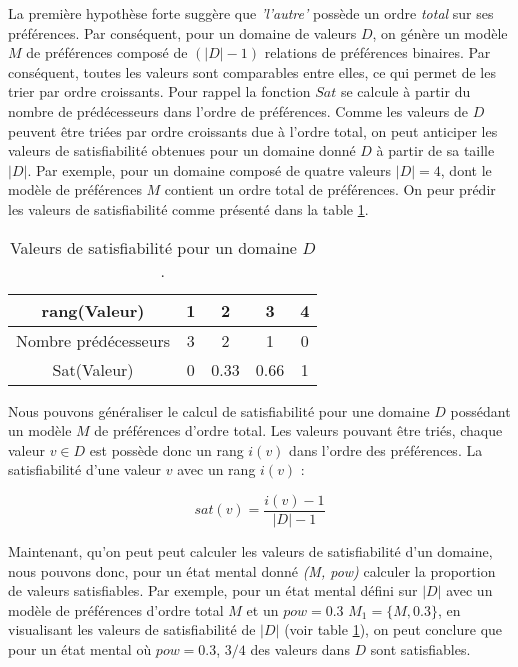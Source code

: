 \documentclass{llncs}
\begin{document}
	La première hypothèse forte suggère que \emph{'l'autre'} possède un ordre \emph{total} sur ses préférences. Par conséquent, pour un domaine de valeurs $D$, on génère un modèle $M$ de préférences composé de $(|D| -1)$ relations de préférences binaires. Par conséquent, toutes les valeurs sont comparables entre elles, ce qui permet de les trier par ordre croissants.
	 Pour rappel la fonction $Sat$ se calcule à partir du nombre de prédécesseurs dans l'ordre de préférences. Comme les valeurs de $D$ peuvent être triées par ordre croissants due à l'ordre total, on peut anticiper les valeurs de satisfiabilité obtenues pour un domaine donné $D$ à partir de sa taille $|D|$.
	 Par exemple, pour un domaine composé de quatre valeurs $ |D|=4$, dont le modèle de préférences $M$ contient un ordre total de préférences. On peur prédir les valeurs de satisfiabilité comme présenté dans la table \ref{poss}.
	 
	 \begin{table}
	 	\centering
	 	\begin{tabular}{ |c|c|c|c|c| }
		 	\hline				
		 	rang(Valeur) & 1 & 2 & 3 & 4 \\
		 	\hline
		 	Nombre prédécesseurs & 3 & 2 & 1& 0 \\
		 	\hline
		 	Sat(Valeur) & 0 & 0.33 & 0.66 &1 \\
		 	\hline
		 	
	 \end{tabular}
	 \caption{Valeurs de satisfiabilité pour un domaine $D$.}
	 \label{poss}
	 \end{table}
	
	Nous pouvons généraliser le calcul de satisfiabilité pour une domaine $D$ possédant un modèle $M$ de préférences d'ordre total. Les valeurs pouvant être triés, chaque valeur $v \in D$ est possède donc un rang $i(v)$ dans l'ordre des préférences. La satisfiabilité d'une valeur $v$ avec un rang $i(v)$ :
	
	\begin{equation}
		sat(v) = \frac{i(v)-1}{|D|-1}
	\end{equation} 
	
	Maintenant, qu'on peut peut calculer les valeurs de satisfiabilité d'un domaine, nous pouvons donc, pour un état mental donné \emph{(M, pow)} calculer la proportion de valeurs satisfiables. 
	Par exemple, pour un état mental défini sur $|D|$ avec un modèle de préférences d'ordre total $M$ et un $pow =0.3$ $M_1 = \{M, 0.3\}$, en visualisant les valeurs de satisfiabilité de $|D|$ (voir table \ref{poss}), on peut conclure que pour un état mental où $pow =0.3$, $3/4$ des valeurs dans $D$ sont satisfiables. 
	
\end{document}
